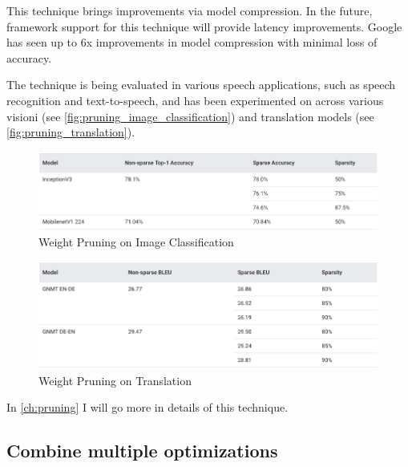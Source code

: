 This technique brings improvements via model compression. In the future,
framework support for this technique will provide latency improvements.
Google has seen up to 6x improvements in model compression with minimal loss of
accuracy.

The technique is being evaluated in various speech applications, such as speech
recognition and text-to-speech, and has been experimented on across various
visioni (see \autoref{fig:pruning_image_classification}) and translation
models (see \autoref{fig:pruning_translation}).~\cite{tfmot:pruning}

\begin{figure}[ht]
    \includegraphics[width=\textwidth]{images/introduction/pruning_image_classification.png}
    \centering
    \caption{Weight Pruning on Image Classification}\label{fig:pruning_image_classification}
\end{figure}

\begin{figure}[ht]
    \includegraphics[width=\textwidth]{images/introduction/pruning_translation.png}
    \centering
    \caption{Weight Pruning on Translation}\label{fig:pruning_translation}
\end{figure}

In \autoref{ch:pruning} I will go more in details of this technique.

\subsection{Combine multiple optimizations}
\lipsum[1]
